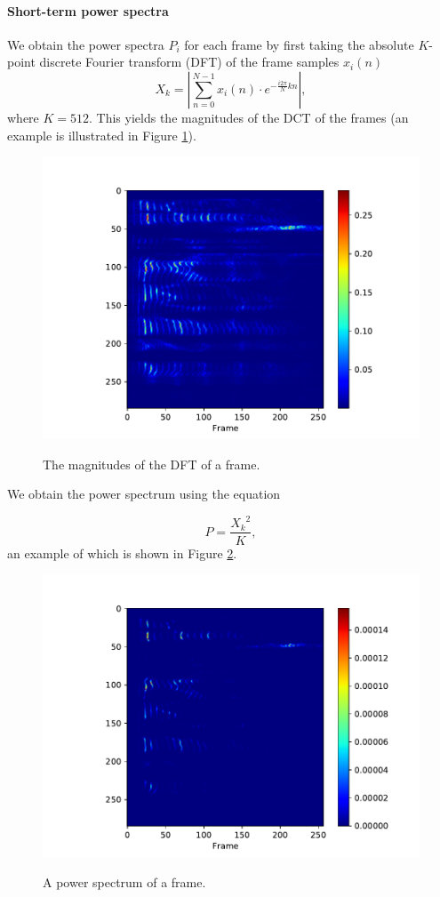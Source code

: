 		\paragraph{Short-term power spectra}

			We obtain the power spectra $P_i$ for each frame by first taking the absolute $K$-point discrete Fourier transform (DFT) of the frame samples $x_i(n)$
			\begin{equation}\label{eq:magframes}
				X_k = \left|\sum_{n=0}^{N-1}x_i(n)\cdot e^{-\frac{i2\pi}{N}kn}\right|,
			\end{equation}
			where $K=512$.
			This yields the magnitudes of the DCT of the frames (an example is illustrated in Figure \ref{fig:magframes}).
			\begin{figure}[ht]
				\centering
			    \includegraphics[width=.45\linewidth]{gfx/magframes}
			    \label{fig:magframes}
			    \caption{The magnitudes of the DFT of a frame.}
			\end{figure}

			We obtain the power spectrum using the equation

			\begin{equation}\label{eq:powframes}
				P = \frac{{X_k}^2}{K},
			\end{equation}
			an example of which is shown in Figure \ref{fig:powframes}.

			\begin{figure}[ht]
				\centering
			    \includegraphics[width=.45\linewidth]{gfx/powframes}
			    \label{fig:powframes}
			    \caption{A power spectrum of a frame.}
			\end{figure}

